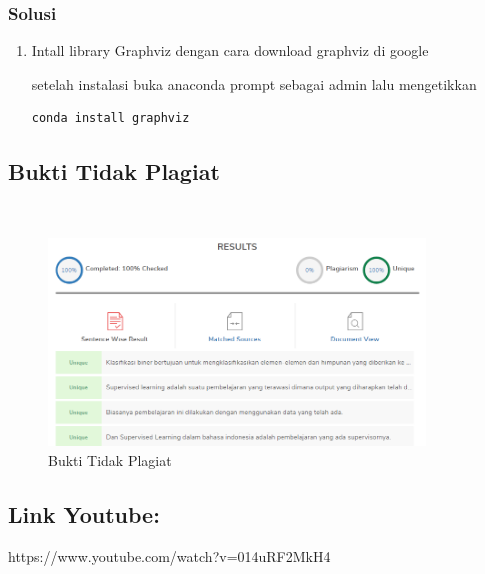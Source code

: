 \subsubsection{Solusi}
\begin{enumerate}
\item Intall library Graphviz dengan cara download graphviz di google

setelah instalasi buka anaconda prompt sebagai admin lalu mengetikkan
\begin{lstlisting}
conda install graphviz
\end{lstlisting} 
\end{enumerate}

\subsection{Bukti Tidak Plagiat}
\hfill\\
\begin{figure}[H]
\centerline{\includegraphics[width=10cm]{figures/1174087/2/plagiat.png}}
\caption{Bukti Tidak Plagiat}
\label{labelgambar}
\end{figure}

\subsection{Link Youtube:}
https://www.youtube.com/watch?v=014uRF2MkH4
